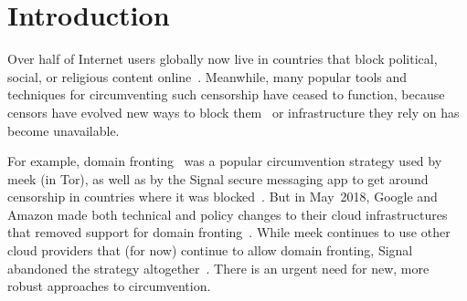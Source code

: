 \documentclass[sigconf,anonymous]{acmart}
\begin{document}


\maketitle


\section{Introduction}

\FigHighLevel



Over half of Internet users globally
now live in countries that block political, social, or religious content
online~\cite{fotn2018}.
Meanwhile, many popular tools and techniques for circumventing such censorship
have ceased to function, because censors have evolved new ways to block them~\cite{ensafi-tor,great-cannon}
or infrastructure they rely on has become unavailable.



For example, domain fronting~\cite{meek} was a popular circumvention
strategy used by meek (in Tor), as well as by the Signal secure messaging app to
get around censorship in countries where it was
blocked~\cite{signal,signal-domain-fronting}.
But in May~2018, Google and Amazon made both technical and policy changes to
their cloud infrastructures that removed support for domain
fronting~\cite{aws-front}. While meek
continues to use other cloud providers that (for now) continue to allow domain
fronting, Signal abandoned the strategy altogether~\cite{signal-back-on-front}.
There is an urgent need for new, more robust approaches to circumvention.

\end{document}
